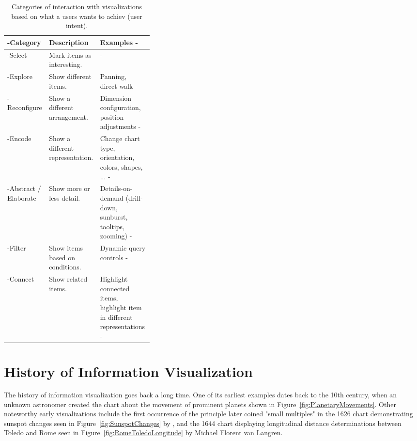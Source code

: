 \begin{table}[tp]
\tablestretch
{}
\centering
\begin{tabularx}{\linewidth}{>{\kern-\tabcolsep}lL{0.35\linewidth}X<{\kern-\tabcolsep}}
\toprule
Category & Description & Examples \\
\midrule
Select               & Mark items as interesting. & \\
Explore              & Show different items. & Panning, direct-walk \\
Reconfigure          & Show a different arrangement. & Dimension configuration, position adjustments \\
Encode               & Show a different representation. & Change chart type, orientation, colors, shapes, ... \\
Abstract / Elaborate & Show more or less detail. & Details-on-demand (drill-down, sunburst, tooltips, zooming) \\
Filter               & Show items based on conditions. & Dynamic query controls \\
Connect              & Show related items. & Highlight connected items, highlight item in different representations \\
\bottomrule
\end{tabularx}
\caption[Categories of Interaction Based on User Intent]{
Categories of interaction with visualizations based on what
a users wants to achiev (user intent).
}
\label{tab:UserIntentCategories}
\end{table}






\section{History of Information Visualization}

The history of information visualization goes back a long time.  One
of its earliest examples dates back to the 10th century, when an
unknown astronomer created the chart about the movement of prominent
planets \parencite{CommentariiInSomniumScipionis} shown in
Figure~\ref{fig:PlanetaryMovements}.  Other noteworthy early
visualizations include the first occurrence of the principle
\textcite{VisualDisplayOfQuantitativeInformation} later coined "small
multiples" in the 1626 chart demonstrating sunspot changes seen in
Figure~\ref{fig:SunspotChanges} by \textcite{RosaUrsina}, and the 1644
chart displaying longitudinal distance determinations between Toledo
and Rome seen in Figure~\ref{fig:RomeToledoLongitude} by Michael
Florent van Langren.


